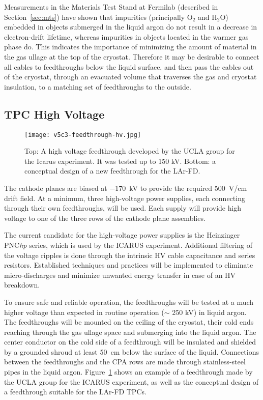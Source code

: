 Measurements in the Materials Test Stand at Fermilab (described in Section~\ref{sec:mts})
have shown that impurities (principally O$_2$ and H$_2$O) embedded in objects submerged in the liquid argon do not result in a decrease in electron-drift lifetime, whereas impurities in objects located in the warmer gas phase do. This indicates the importance of minimizing the amount of material in the gas ullage at the top of the cryostat.  Therefore it may be desirable to connect all cables to feedthroughs below the liquid surface, and then pass the cables out of the cryostat, through an evacuated volume that traverses the gas and cryostat insulation, to a matching set of feedthroughs to the outside. 

\subsection{TPC High Voltage }
\label{subsec:v5-tpc-feedthru-tpchv}

\begin{figure}[htbp]
\centering
\texttt{[image: v5c3-feedthrough-hv.jpg]}
\caption[ICARUS HV feedthrough; concept of new feedthrough]{Top: A high voltage feedthrough developed by the UCLA 
group for the Icarus experiment.  It was tested up to 150 kV.  Bottom: a conceptual design of a new feedthrough for the LAr-FD.}
\label{fig:tpc-UCLA-feedthrough}
\end{figure}

The cathode planes are biased at $-$170~kV to provide the required 
500~V/cm drift field. At a minimum, three high-voltage power 
supplies, each connecting through their own feedthroughs, will be used. Each supply will
provide high voltage to one of the three rows of the cathode plane assemblies.

The current candidate for the high-voltage power supplies is 
the Heinzinger PNC{\it hp} series, which is used by the ICARUS 
experiment.  Additional filtering of the voltage ripples is done through the intrinsic HV cable capacitance 
and series resistors. Established techniques and practices will be implemented to eliminate 
micro-discharges and minimize unwanted energy transfer in case of an HV breakdown. 
  
To ensure safe and reliable operation, the feedthroughs will be 
tested at a much higher voltage than expected in
routine operation ($\sim$ 250 kV) in liquid argon. 
 The feedthroughs will be 
mounted on the ceiling of the cryostat, their cold ends reaching 
through the gas ullage space and submerging into the liquid argon. 
The center conductor on the cold side of a feedthrough will be 
insulated and shielded by a grounded shroud at least 50~cm below the 
surface of the liquid. Connections between the feedthroughs 
and the CPA rows are made through stainless-steel pipes in the 
liquid argon. Figure~\ref{fig:tpc-UCLA-feedthrough} shows an example 
of a feedthrough made by the UCLA group for the ICARUS experiment, as well as the conceptual design of a feedthrough suitable for the LAr-FD TPCs.

